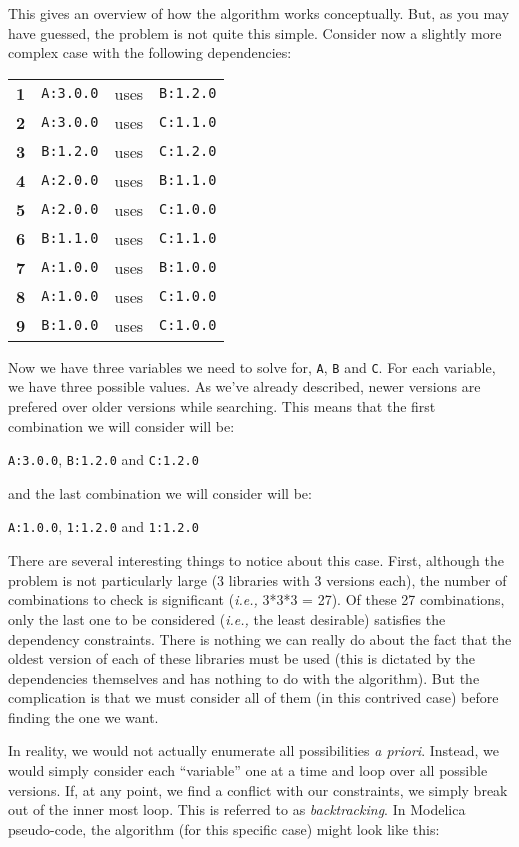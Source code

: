 \documentclass[11pt,a4paper,twocolumn]{article}
\renewcommand{\small}{\fontsize{9.5pt}{11.1pt}\selectfont}
\newcommand{\code}[1]{\texttt{#1}} %
\begin{document}
This gives an overview of how the algorithm works conceptually.  But,
as you may have guessed, the problem is not quite this simple.
Consider now a slightly more complex case with the following
dependencies:
{\small
\begin{center}
\begin{tabular}{llcl}
  \textbf{1} &\code{A:3.0.0} &uses &\code{B:1.2.0} \\
  \textbf{2} &\code{A:3.0.0} &uses &\code{C:1.1.0}\\
  \textbf{3} &\code{B:1.2.0} &uses &\code{C:1.2.0}\\
  \textbf{4} &\code{A:2.0.0} &uses &\code{B:1.1.0}\\
  \textbf{5} &\code{A:2.0.0} &uses &\code{C:1.0.0}\\
  \textbf{6} &\code{B:1.1.0} &uses &\code{C:1.1.0}\\
  \textbf{7} &\code{A:1.0.0} &uses &\code{B:1.0.0}\\
  \textbf{8} &\code{A:1.0.0} &uses &\code{C:1.0.0}\\
  \textbf{9} &\code{B:1.0.0} &uses &\code{C:1.0.0}
\end{tabular}
\end{center}
} Now we have three variables we need to solve for, \code{A}, \code{B}
and \code{C}.  For each variable, we have three possible values.  As
we've already described, newer versions are prefered over older
versions while searching.  This means that the first combination we
will consider will be:

\code{A:3.0.0}, \code{B:1.2.0} and \code{C:1.2.0}

and the last combination we will consider will be:

\code{A:1.0.0}, \code{1:1.2.0} and \code{1:1.2.0}

There are several interesting things to notice about this case.
First, although the problem is not particularly large (3 libraries
with 3 versions each), the number of combinations to check is
significant (\emph{i.e.,} 3*3*3 = 27).  Of these 27 combinations, only
the last one to be considered (\emph{i.e.,} the least desirable)
satisfies the dependency constraints.  There is nothing we can really
do about the fact that the oldest version of each of these libraries
must be used (this is dictated by the dependencies themselves and has
nothing to do with the algorithm).  But the complication is that we
must consider all of them (in this contrived case) before finding the
one we want.

In reality, we would not actually enumerate all possibilities {\it a
  priori}.  Instead, we would simply consider each ``variable'' one at
a time and loop over all possible versions.  If, at any point, we find
a conflict with our constraints, we simply break out of the inner most
loop.  This is referred to as \emph{backtracking}.  In Modelica
pseudo-code, the algorithm (for this specific case) might look like
this:
\end{document}
